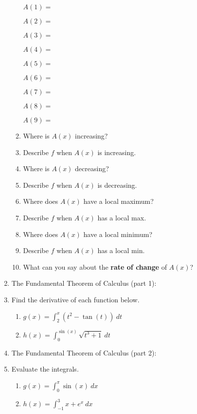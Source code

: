 \documentclass[11pt,fleqn]{article}
\renewcommand{\d}{\displaystyle}
\begin{document}
\begin{enumerate}
\begin{enumerate}
\begin{multicols}{4}
$A(1) =$ \hrulefill

\vfill
$A(2) = $\hrulefill
\vfill

$A(3) =$ \hrulefill
\vfill

$A(4) = $\hrulefill
\vfill

$A(5) = $\hrulefill
\vfill

$A(6) = $\hrulefill
\vfill

$A(7) = $\hrulefill
\vfill

$A(8) = $\hrulefill
\vfill

$A(9) = $\hrulefill
\vfill


\end{multicols}

\vfill

\item  Where is $A(x)$ increasing? \hrulefill
\vfill

\item Describe $f$ when $A(x)$ is increasing. \hrulefill
\vfill

\item Where is $A(x)$ decreasing? \hrulefill
\vfill

\item Describe $f$ when $A(x)$ is decreasing. \hrulefill
\vfill

\item Where does $A(x)$ have a local maximum? \hrulefill
\vfill

\item Describe $f$ when $A(x)$ has a local max. \hrulefill
\vfill

\item Where does $A(x)$ have a local minimum? \hrulefill
\vfill

\item Describe $f$ when $A(x)$ has a local min. \hrulefill

\vfill
\item What can you say about the {\bf rate of change} of $A(x)$? 
\vfill
\end{enumerate}
\newpage
\item The Fundamental Theorem of Calculus (part 1):
\vfill
\item Find the derivative of each function below.
	\begin{multicols}{2}
	\begin{enumerate}
	\item $\d g(x)=\int_2^x (t^2-\tan (t) ) \: dt$
	\item $\d h(x)=\int_0^{\sin(x)} \sqrt{t^3+1} \: dt$
	\end{enumerate}
	\end{multicols}
\vfill
\item The Fundamental Theorem of Calculus (part 2):
\vfill
\item Evaluate the integrals.
	\begin{multicols}{2}
	\begin{enumerate}
	\item $\d g(x)=\int_0^{\pi} \sin (x) \: dx$
	\item $\d h(x)=\int_{-1}^3 x+e^x \: dx$
	\end{enumerate}
	\end{multicols}
\vfill


\end{enumerate}
\end{document}

